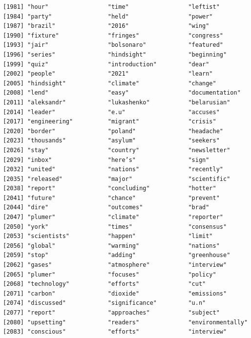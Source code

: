 \documentclass[
  letterpaper,
  DIV=11,
  numbers=noendperiod]{scrartcl}
\begin{document}
\begin{verbatim}
[1981] "hour"                 "time"                 "leftist"             
[1984] "party"                "held"                 "power"               
[1987] "brazil"               "2016"                 "wing"                
[1990] "fixture"              "fringes"              "congress"            
[1993] "jair"                 "bolsonaro"            "featured"            
[1996] "series"               "hindsight"            "beginning"           
[1999] "quiz"                 "introduction"         "dear"                
[2002] "people"               "2021"                 "learn"               
[2005] "hindsight"            "climate"              "change"              
[2008] "lend"                 "easy"                 "documentation"       
[2011] "aleksandr"            "lukashenko"           "belarusian"          
[2014] "leader"               "e.u"                  "accuses"             
[2017] "engineering"          "migrant"              "crisis"              
[2020] "border"               "poland"               "headache"            
[2023] "thousands"            "asylum"               "seekers"             
[2026] "stay"                 "country"              "newsletter"          
[2029] "inbox"                "here’s"               "sign"                
[2032] "united"               "nations"              "recently"            
[2035] "released"             "major"                "scientific"          
[2038] "report"               "concluding"           "hotter"              
[2041] "future"               "chance"               "prevent"             
[2044] "dire"                 "outcomes"             "brad"                
[2047] "plumer"               "climate"              "reporter"            
[2050] "york"                 "times"                "consensus"           
[2053] "scientists"           "happen"               "limit"               
[2056] "global"               "warming"              "nations"             
[2059] "stop"                 "adding"               "greenhouse"          
[2062] "gases"                "atmosphere"           "interview"           
[2065] "plumer"               "focuses"              "policy"              
[2068] "technology"           "efforts"              "cut"                 
[2071] "carbon"               "dioxide"              "emissions"           
[2074] "discussed"            "significance"         "u.n"                 
[2077] "report"               "approaches"           "subject"             
[2080] "upsetting"            "readers"              "environmentally"     
[2083] "conscious"            "efforts"              "interview"           

\end{verbatim}
\end{document}

